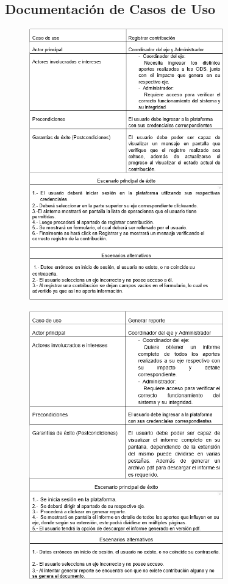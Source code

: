 \documentclass[12pt]{article}
\begin{document}
\clearpage
\subsection{Documentación de Casos de Uso}

\begin{figure}[h]
  \centering
  \includegraphics[width=0.75\textwidth]{caso1.png}
\end{figure}

\begin{figure}[h]
  \centering
  \includegraphics[width=0.75\textwidth]{caso2.png}
\end{figure}
\end{document}
